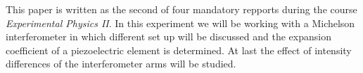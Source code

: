 This paper is written as the second of four mandatory repports during the course \emph{Experimental Physics II}. In this experiment we will be working with a Michelson interferometer in which different set up will be discussed and the expansion coefficient of a piezoelectric element is determined. At last the effect of intensity differences of the interferometer arms will be studied.


